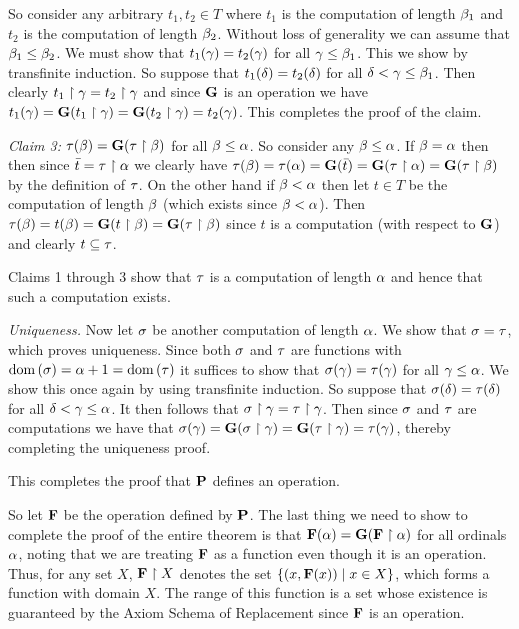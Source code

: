 \begin{questions}
{{      So consider any arbitrary $t_1, t_2 \in T$ where $t_1$ is the computation of length $\b_1$ and $t_2$ is the computation of length $\b_2$.
      Without loss of generality we can assume that $\b_1 \leq \b_2$.
      We must show that $t_1(\g) = t_2(\g)$ for all $\g \leq \b_1$.
      This we show by transfinite induction.
      So suppose that $t_1(\d) = t_2(\d)$ for all $\d < \g \leq \b_1$.
      Then clearly $t_1 \rest \g = t_2 \rest \g$ and since $\G$ is an operation we have $t_1(\g) = \G(t_1 \rest \g) = \G(t_2 \rest \g) = t_2(\g)$.
      This completes the proof of the claim.

      \emph{Claim 3:} $\t(\b) = \G(\t \rest \b)$ for all $\b \leq \a$.
      So consider any $\b \leq \a$.
      If $\b = \a$ then then since $\bar{t} = \t \rest \a$ we clearly have $\t(\b) = \t(\a) = \G(\bar{t}) = \G(\t \rest \a) = \G(\t \rest \b)$ by the definition of $\t$.
      On the other hand if $\b < \a$ then let $t \in T$ be the computation of length $\b$ (which exists since $\b < \a$).
      Then $\t(\beta) = t(\b) = \G(t \rest \b) = \G(\t \rest \b)$ since $t$ is a computation (with respect to $\G$) and clearly $t \ss \t$.

      Claims 1 through 3 show that $\t$ is a computation of length $\a$ and hence that such a computation exists.

      \emph{Uniqueness.} Now let $\s$ be another computation of length $\a$.
      We show that $\s = \t$, which proves uniqueness.
      Since both $\s$ and $\t$ are functions with $\dom(\s) = \a+1 = \dom(\t)$ it suffices to show that $\s(\g) = \t(\g)$ for all $\g \leq \a$.
      We show this once again by using transfinite induction.
      So suppose that $\s(\d) = \t(\d)$ for all $\d < \g \leq \a$.
      It then follows that $\s \rest \g = \t \rest \g$.
      Then since $\s$ and $\t$ are computations we have that $\s(\g) = \G(\s \rest \g) = \G(\t \rest \g) = \t(\g)$, thereby completing the uniqueness proof.

      This completes the proof that $\P$ defines an operation.

      So let $\F$ be the operation defined by $\P$.
      The last thing we need to show to complete the proof of the entire theorem is that $\F(\a) = \G(\F \rest \a)$ for all ordinals $\a$, noting that we are treating $\F$ as a function even though it is an operation.
      Thus, for any set $X$, $\F \rest X$ denotes the set $\braces{(x, \F(x)) \where x \in X}$, which forms a function with domain $X$.
      The range of this function is a set whose existence is guaranteed by the Axiom Schema of Replacement since $\F$ is an operation.

}}
\end{questions}
